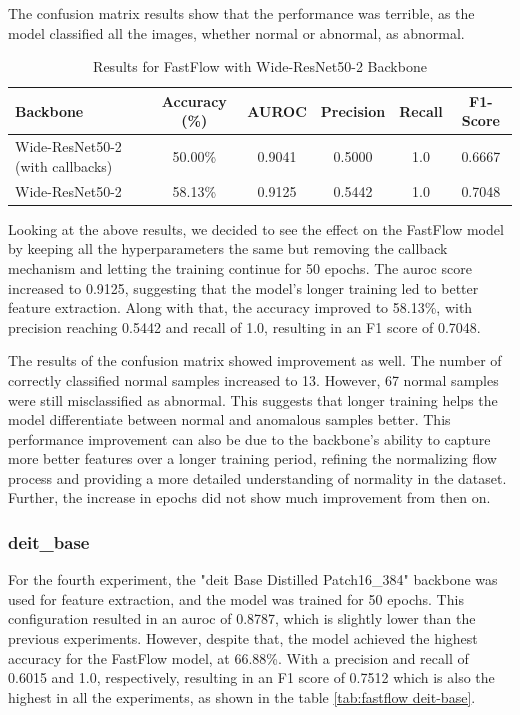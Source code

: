 The confusion matrix results show that the performance was terrible, as the model classified all the images, whether normal or abnormal, as abnormal.

\begin{table}[ht!]
    \centering
    \begin{tabular}{|l|c|c|c|c|c|}
        \hline
        \textbf{Backbone} & \textbf{Accuracy (\%)} & \textbf{AUROC} & \textbf{Precision} & \textbf{Recall} & \textbf{F1-Score} \\ \hline
        Wide-ResNet50-2 (with callbacks) & 50.00\% & 0.9041 & 0.5000 & 1.0 & 0.6667 \\ \hline
        Wide-ResNet50-2 & 58.13\% & 0.9125 & 0.5442 & 1.0 & 0.7048 \\ \hline
    \end{tabular}
    \caption{Results for FastFlow with Wide-ResNet50-2 Backbone}
    \label{tab:fastflow wideresnet50}
\end{table}

Looking at the above results, we decided to see the effect on the FastFlow model by keeping all the hyperparameters the same but removing the callback mechanism and letting the training continue for 50 epochs. The \gls{auroc} score increased to 0.9125, suggesting that the model's longer training led to better feature extraction. Along with that, the accuracy improved to 58.13\%, with precision reaching 0.5442 and recall of 1.0, resulting in an F1 score of 0.7048.

The results of the confusion matrix showed improvement as well. The number of correctly classified normal samples increased to 13. However, 67 normal samples were still misclassified as abnormal. This suggests that longer training helps the model differentiate between normal and anomalous samples better. This performance improvement can also be due to the backbone's ability to capture more better features over a longer training period, refining the normalizing flow process and providing a more detailed understanding of normality in the dataset. Further, the increase in epochs did not show much improvement from then on.

\subsubsection*{\gls{deit}\_base}

For the fourth experiment, the "\gls{deit} Base Distilled Patch16\_384" backbone was used for feature extraction, and the model was trained for 50 epochs. This configuration resulted in an \gls{auroc} of 0.8787, which is slightly lower than the previous experiments. However, despite that, the model achieved the highest accuracy for the FastFlow model, at 66.88\%. With a precision and recall of 0.6015 and 1.0, respectively, resulting in an F1 score of 0.7512 which is also the highest in all the experiments, as shown in the table \ref{tab:fastflow deit-base}.


